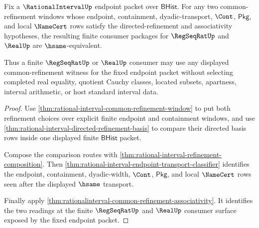 \begin{theorem}
\label{thm:rationalinterval-refinement-choice-neutrality}
Fix a $\RationalIntervalUp$ endpoint packet over $\mathsf{BHist}$. For any
two common-refinement windows whose endpoint, containment, dyadic-transport,
$\Cont$, $\mathsf{Pkg}$, and local $\NameCert$ rows satisfy the
directed-refinement and associativity hypotheses, the resulting finite consumer
packages for $\RegSeqRatUp$ and $\RealUp$ are $\hsame$-equivalent.

Thus a finite $\RegSeqRatUp$ or $\RealUp$ consumer may use any displayed
common-refinement witness for the fixed endpoint packet without selecting
completed real equality, quotient Cauchy classes, located subsets, apartness,
interval arithmetic, or host standard interval data.
\end{theorem}
\begin{proof}
Use \autoref{thm:rational-interval-common-refinement-window} to put both
refinement choices over explicit finite endpoint and containment windows, and
use \autoref{thm:rational-interval-directed-refinement-basis} to compare their
directed basis rows inside one displayed finite $\mathsf{BHist}$ packet.

Compose the comparison routes with
\autoref{thm:rational-interval-refinement-composition}. Then
\autoref{thm:rational-interval-endpoint-transport-classifier} identifies the
endpoint, containment, dyadic-width, $\Cont$, $\mathsf{Pkg}$, and local
$\NameCert$ rows seen after the displayed $\hsame$ transport.

Finally apply \autoref{thm:rationalinterval-common-refinement-associativity}.
It identifies the two readings at the finite $\RegSeqRatUp$ and $\RealUp$
consumer surface exposed by the fixed endpoint packet.
\end{proof}

